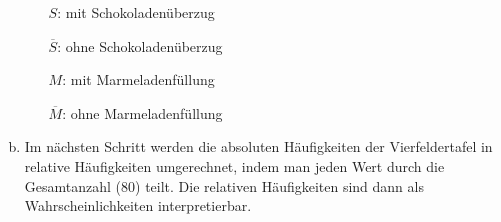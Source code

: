 \begin{exercise}
\begin{enumerate}[a)]
\begin{minipage}{0.38\linewidth}
              \begin{itemize}
                \renewcommand{\itemsep}{-1ex}%
                \item[$S$:] \glqq mit Schokoladenüberzug\grqq
                \item[$\overline{S}$:] \glqq ohne Schokoladenüberzug\grqq
                \item[$M$:] \glqq mit Marmeladenfüllung\grqq
                \item[$\overline{M}$:] \glqq ohne Marmeladenfüllung\grqq
              \end{itemize}%
            \end{minipage}%
      \item Im nächsten Schritt werden die absoluten
            Häufigkeiten der Vierfeldertafel in relative
            Häufigkeiten umgerechnet, indem man jeden
            Wert durch die Gesamtanzahl (80) teilt. Die
            relativen Häufigkeiten sind dann als
            Wahrscheinlichkeiten interpretierbar.
            \begin{center}
              \begin{fofotab}%

\end{fofotab}
\end{center}
\end{enumerate}
\end{exercise}
